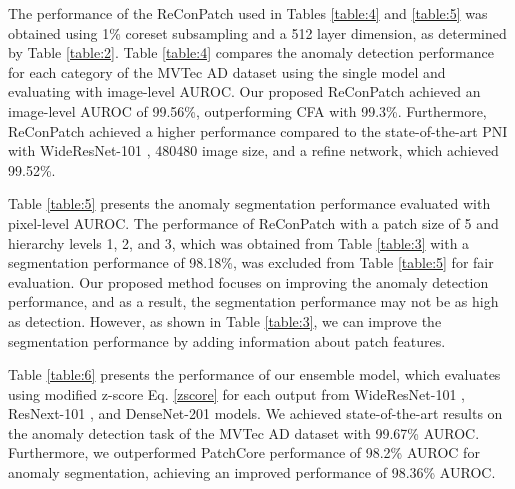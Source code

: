 \documentclass[10pt,onecolumn,letterpaper]{article}
\begin{document}
The performance of the ReConPatch used in Tables \ref{table:4} and \ref{table:5} was obtained using 1\% coreset subsampling and a 512  layer dimension, as determined by Table \ref{table:2}.
Table \ref{table:4} compares the anomaly detection performance for each category of the MVTec AD \cite{bergmann2019mvtec} dataset using the single model and evaluating with image-level AUROC. Our proposed ReConPatch achieved an image-level AUROC of 99.56\%, outperforming CFA \cite{lee2022cfa} with 99.3\%. Furthermore, ReConPatch achieved a higher performance compared to the state-of-the-art PNI \cite{bae2022image} with WideResNet-101 \cite{zagoruyko2016wide}, 480480 image size, and a refine network, which achieved 99.52\%.

Table \ref{table:5} presents the anomaly segmentation performance evaluated with pixel-level AUROC. The performance of ReConPatch with a patch size of 5 and hierarchy levels 1, 2, and 3, which was obtained from Table \ref{table:3} with a segmentation performance of 98.18\%, was excluded from Table \ref{table:5} for fair evaluation. Our proposed method focuses on improving the anomaly detection performance, and as a result, the segmentation performance may not be as high as detection. However, as shown in Table \ref{table:3}, we can improve the segmentation performance by adding information about patch features.

Table \ref{table:6} presents the performance of our ensemble model, which evaluates using modified z-score Eq. \ref{zscore} for each output from WideResNet-101 \cite{zagoruyko2016wide}, ResNext-101 \cite{xie2017aggregated}, and DenseNet-201 \cite{huang2017densely} models. We achieved state-of-the-art results on the anomaly detection task of the MVTec AD dataset with 99.67\% AUROC. Furthermore, we outperformed PatchCore \cite{roth2022towards} performance of 98.2\% AUROC for anomaly segmentation, achieving an improved performance of 98.36\% AUROC.
\end{document}
